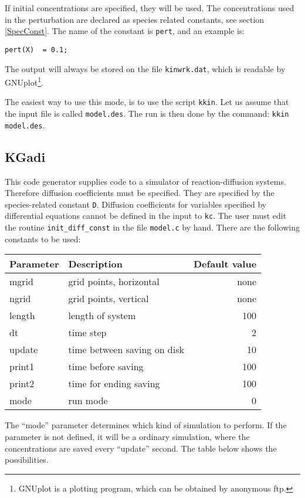 If initial concentrations are specified, they will be used. The
concentrations used in the perturbation are declared as species
related constants, see section \ref{SpecConst}. The name of the
constant is {\tt pert}, and an example is:

\begin{verbatim}
pert(X)  = 0.1;
\end{verbatim}

The output will always be stored on the file {\tt kinwrk.dat}, which is
readable by GNUplot\footnote{GNUplot is a plotting program, which can
  be obtained by anonymous ftp.}.

The easiest way to use this mode, is to use the script {\tt kkin}. 
Let us assume that the input file is called {\tt model.des}. The
run is then done by the command: {\tt kkin model.des}. 

\subsection{KGadi}
This code generator supplies code to a simulator of reaction-diffusion
systems. Therefore diffusion coefficients must be specified. They are
specified by the species-related constant {\tt D}. Diffusion
coefficients for variables specified by differential equations cannot
be defined in the input to {\tt kc}. The user must edit the routine
{\tt init\_diff\_const} in the file {\tt model.c} by hand. There are the
following constants to be used:

\begin{center}
\begin{tabular}{llr}
\hline
Parameter & Description & Default value \\ \hline
mgrid     & grid points, horizontal & none \\
ngrid     & grid points, vertical   & none \\
length    & length of system & 100 \\
dt        & time step        & 2 \\
update    & time between saving on disk & 10 \\
print1    & time before saving & 100\\
print2    & time for ending saving & 100 \\ 
mode      & run mode & 0 \\ \hline
\end{tabular}
\end{center}

The ``mode'' parameter determines which kind of simulation to perform.
If the parameter is not defined, it will be a ordinary simulation,
where the concentrations are saved every ``update'' second. 
The table below shows the possibilities.

